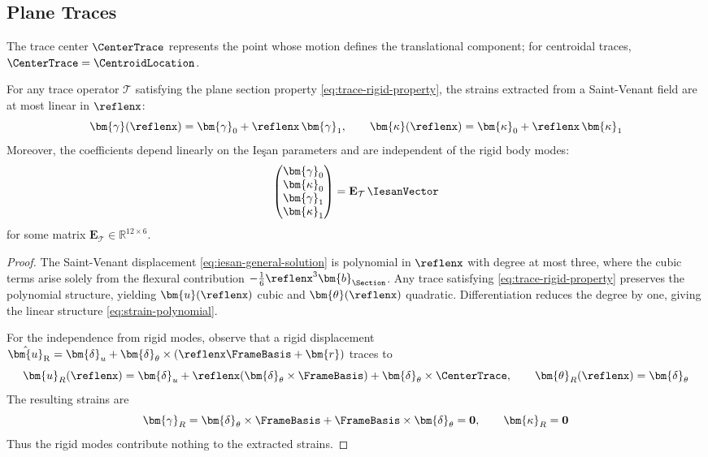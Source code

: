 \subsection{Plane Traces}

The trace center $\CenterTrace$ represents the point 
whose motion defines the translational component; for centroidal traces, 
$\CenterTrace = \CentroidLocation$.

\begin{proposition}
\label{prop:strain-polynomial}
For any trace operator $\mathcal{T}$ satisfying the plane section property \eqref{eq:trace-rigid-property}, 
the strains extracted from a Saint-Venant field are at most linear in $\reflenx$:
\begin{equation}
\bm{\gamma}(\reflenx) = \bm{\gamma}_0 + \reflenx \, \bm{\gamma}_1, 
\qquad 
\bm{\kappa}(\reflenx) = \bm{\kappa}_0 + \reflenx \, \bm{\kappa}_1
\label{eq:strain-polynomial}
\end{equation}
Moreover, the coefficients depend linearly on the Ieşan parameters and are 
independent of the rigid body modes:
\begin{equation}
\begin{pmatrix} \bm{\gamma}_0 \\ \bm{\kappa}_0 \\ \bm{\gamma}_1 \\ \bm{\kappa}_1 \end{pmatrix}
= \mathbf{E}_{\mathcal{T}} \, \IesanVector
\label{eq:strain-coefficients}
\end{equation}
for some matrix $\mathbf{E}_{\mathcal{T}} \in \mathbb{R}^{12 \times 6}$.
\end{proposition}

\begin{proof}
The Saint-Venant displacement \eqref{eq:iesan-general-solution} is polynomial 
in $\reflenx$ with degree at most three, where the cubic terms arise solely from 
the flexural contribution $-\tfrac{1}{6}\reflenx^3 \bm{b}_\Section$. 
Any trace satisfying \eqref{eq:trace-rigid-property} preserves the polynomial 
structure, yielding $\bm{u}(\reflenx)$ cubic and $\bm{\theta}(\reflenx)$ quadratic. 
Differentiation reduces the degree by one, giving the linear structure 
\eqref{eq:strain-polynomial}.

For the independence from rigid modes, observe that a rigid displacement 
$\hat{\bm{u}}_{\rm R} = \bm{\delta}_u + \bm{\delta}_\theta \times (\reflenx \FrameBasis + \bm{r})$ 
traces to
\begin{equation*}
\bm{u}_R(\reflenx) = \bm{\delta}_u + \reflenx (\bm{\delta}_\theta \times \FrameBasis) 
+ \bm{\delta}_\theta \times \CenterTrace, 
\qquad 
\bm{\theta}_R(\reflenx) = \bm{\delta}_\theta
\end{equation*}
The resulting strains are
\begin{equation*}
\bm{\gamma}_R = \bm{\delta}_\theta \times \FrameBasis + \FrameBasis \times \bm{\delta}_\theta 
= \mathbf{0}, 
\qquad 
\bm{\kappa}_R = \mathbf{0}
\end{equation*}
Thus the rigid modes contribute nothing to the extracted strains.
\end{proof}

